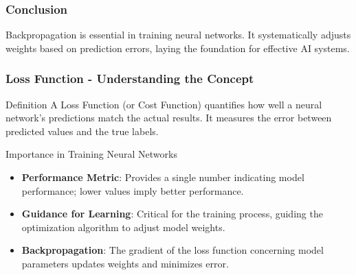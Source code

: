 \documentclass[aspectratio=169]{beamer}
\begin{document}
\begin{frame}[fragile]
    \frametitle{Conclusion}
    Backpropagation is essential in training neural networks. It systematically adjusts weights based on prediction errors, laying the foundation for effective AI systems.
\end{frame}

\begin{frame}[fragile]
    \frametitle{Loss Function - Understanding the Concept}
    \begin{block}{Definition}
        A Loss Function (or Cost Function) quantifies how well a neural network's predictions match the actual results. It measures the error between predicted values and the true labels.
    \end{block}

    \begin{block}{Importance in Training Neural Networks}
        \begin{itemize}
            \item \textbf{Performance Metric}: Provides a single number indicating model performance; lower values imply better performance.
            \item \textbf{Guidance for Learning}: Critical for the training process, guiding the optimization algorithm to adjust model weights.
            \item \textbf{Backpropagation}: The gradient of the loss function concerning model parameters updates weights and minimizes error.
        \end{itemize}
    \end{block}
\end{frame}
\end{document}
